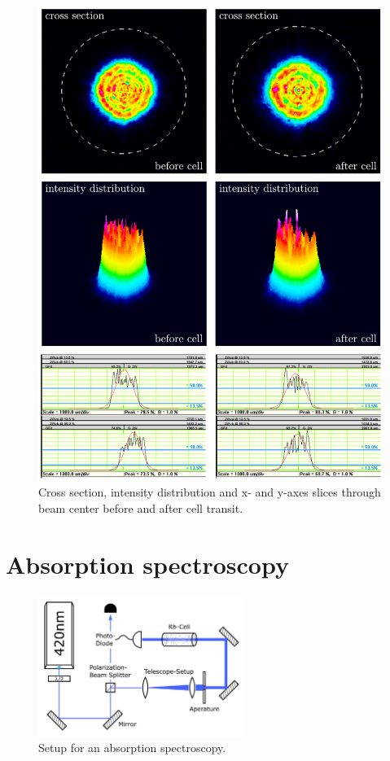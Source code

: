 \pagebreak
\begin{figure}
    \centering
    \includegraphics[width=.9\textwidth]{beam}
    \caption{\label{fig:beam} Cross section, intensity distribution and x- and 
    y-axes slices through beam center before and after cell transit.}
\end{figure}

\pagebreak
\section{Absorption spectroscopy}\label{sec:absorption_spec} %

\begin{figure}[!htb]
    \centering
    \includegraphics[width=0.6\textwidth]{absorption_spectroscopy}    
    \caption{\label{fig:absorption_spectroscopy_setup} Setup for an absorption 
    spectroscopy.}
\end{figure}

